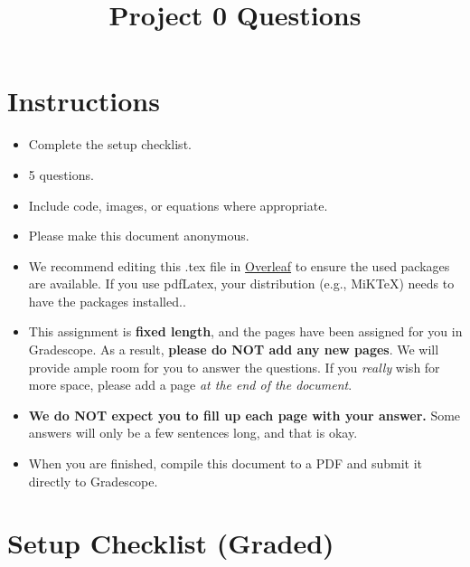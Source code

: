 \documentclass[11pt]{article}
\date{}
\title{\vspace{-1cm}Project 0 Questions}
\begin{document}
\maketitle
\vspace{-2cm}
\thispagestyle{fancy}

\section*{Instructions}
\begin{itemize}
  \item Complete the setup checklist.
  \item 5 questions.
  \item Include code, images, or equations where appropriate.
  \item Please make this document anonymous.
  \item We recommend editing this .tex file in \href{https://www.overleaf.com/}{Overleaf} to ensure the used packages are available. If you use pdfLatex, your distribution (e.g., MiKTeX) needs to have the packages installed..
  \item This assignment is \textbf{fixed length}, and the pages have been assigned for you in Gradescope. As a result, \textbf{please do NOT add any new pages}. We will provide ample room for you to answer the questions. If you \emph{really} wish for more space, please add a page \emph{at the end of the document}.
  \item \textbf{We do NOT expect you to fill up each page with your answer.} Some answers will only be a few sentences long, and that is okay.
  \item When you are finished, compile this document to a PDF and submit it directly to Gradescope.

\end{itemize}

\section*{Setup Checklist (Graded)}
\end{document}
